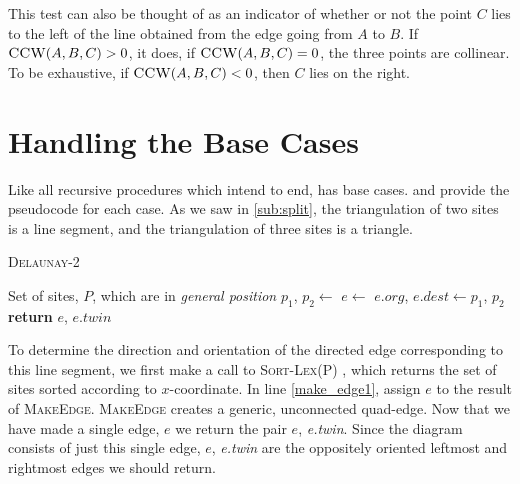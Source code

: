 \documentclass[12pt,twoside]{reedthesis}
\begin{document}
      This test can also be thought of as an indicator of whether or not the point $C$ lies to the left of the line obtained from the edge going from $A$ to $B$. If $\textsc{CCW}(A,B,C) > 0$, it does, if $\textsc{CCW}(A,B,C) = 0$, the three points are collinear. To be exhaustive, if $\textsc{CCW}(A,B,C) < 0$, then $C$ lies on the right.
  \newpage
  \section{Handling the Base Cases} %
  \label{sec:handling_the_base_cases}
    Like all recursive procedures which intend to end,  has base cases.  and  provide the pseudocode for each case. As we saw in \cref{sub:split}, the triangulation of two sites is a line segment, and the triangulation of three sites is a triangle. \par

    \begin{algorithm}[!htb]
    \caption{\textsc{Delaunay-2}}\label{bc_del_2}
    \begin{algorithmic}[1]
    \Require Set of sites, $P$, which are in \emph{general position}
      \State $p_{1}$, $p_{2}\gets$  \label{sort_1}
      \State $e\gets$\label{make_edge1}
      \State $e.org$, $e.dest \gets p_{1}$, $p_{2}$
      \State \textbf{return} $e$, $e.twin$ \label{return_1}
    \EndProcedure
    \end{algorithmic} 
    \end{algorithm}

    To determine the direction and orientation of the directed edge corresponding to this line segment, we first make a call to \textsc{Sort-Lex}(P) , which returns the set of sites sorted according to $x$-coordinate. In line \ref{make_edge1}, assign $e$ to the result of \textsc{MakeEdge}. \textsc{MakeEdge} creates a generic, unconnected quad-edge. Now that we have made a single edge, $e$ we return the pair $e$, \textit{e.twin}. Since the diagram consists of just this single edge, $e$, \textit{e.twin} are the oppositely oriented leftmost and rightmost edges we should return.
\end{document}
